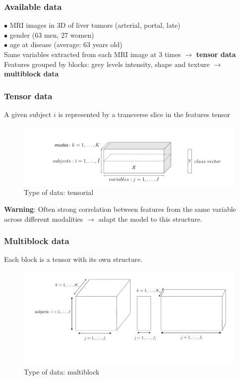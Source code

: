 \documentclass{beamer}
\begin{document}
\begin{frame}
    \frametitle{Available data}

    $\bullet$ MRI images in 3D of liver tumors (arterial, portal, late)\\[5 pt]
    $\bullet$ gender (63 men, 27 women)\\[5 pt]
    $\bullet$ age at disease (average: $63$ years old)\\[15 pt]

    Same variables extracted from each MRI image at 3 times  $\rightarrow$ \textbf{tensor data}\\[10 pt]

    Features grouped by blocks: grey levels intensity, shape and texture $\rightarrow$ \textbf{multiblock data}\\[10 pt]

    
\end{frame}

\begin{frame}
    \frametitle{Tensor data}
A given subject $i$ is represented by a transverse slice in the features tensor
    \begin{figure}
        \centering
        \includegraphics[scale = 0.23]{images/tensor_mode.png}
        \caption{Type of data: tensorial}
    \end{figure}

\textbf{Warning}: Often strong correlation between features from the same variable across different modalities $\rightarrow$ adapt the model to this structure.
\end{frame}

\begin{frame}
    \frametitle{Multiblock data}
Each block is a tensor with its own structure.
    \begin{figure}
        \centering
        \includegraphics[scale = 0.25]{images/blocks.png}
        \caption{Type of data: multiblock}
    \end{figure}


\end{frame}
\end{document}
